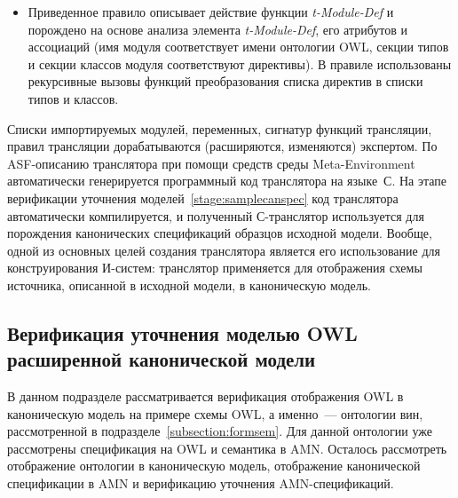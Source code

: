 \begin{multicols}{2}
\begin{itemize}
{\small
\hspace*{-2.82115pt}\tabcolsep=0pt\begin{tabular}{lp{75.9mm}}
&\begin{verbatim}
[Module-Def]
Synthesis-Id := t-Module-Name(OwlID),
Type-Specification* :=
t-Type-Specification-List(Directive*),
Class-Declarator* :=
t-Class-Declarator-List(Directive*)
====>
t-Module-Def(Ontology(OwlID Directive*))
=
{ Synthesis-Id; in: module;
  type: Type-Specification*;
  class_specification:
   Class-Declarator*;
}
\end{verbatim}\\
\end{tabular}
}

\item [\ ] Приведенное правило описывает действие функции {\it t-Module-Def} и
порождено на основе анализа элемента {\it t-Module-Def}, его атрибутов и
ассоциаций (имя модуля соответствует имени онтологии OWL,
секции типов и секции классов модуля соответствуют директивы).
В правиле использованы рекурсивные вызовы функций
преобразования списка директив в списки типов и классов.
\end{itemize}

Списки импортируемых модулей, переменных, сигнатур функций трансляции,
правил трансляции дорабатываются (расширяются, изменяются) экспертом.
%
По ASF-описанию транслятора при помощи средств среды Meta-Environment
автоматически генерируется программный код транслятора на языке~С.
На этапе верификации уточнения моделей~\ref{stage:samplecanspec}
код транслятора автоматически компилируется,
и полученный С-тран\-с\-ля\-тор используется для
по\-рож\-де\-ния канонических спецификаций образцов исходной модели.
Вообще, одной из основных целей создания транслятора является его
использование для конструирования И-сис\-тем:
транслятор применяется для отображения схемы источника,
описанной в исходной модели, в каноническую модель.


\subsection{Верификация уточнения моделью OWL расширенной канонической модели}

В данном подразделе рассматривается верификация отображения OWL
в каноническую модель на примере схемы OWL, а именно~--- онтологии вин,
рассмотренной в подразделе~\ref{subsection:formsem}.
Для данной онтологии уже рассмотрены спецификация на OWL
и семантика в AMN. Осталось рассмотреть отображение онтологии в
каноническую модель, отображение канонической спецификации в AMN
и верификацию уточнения AMN-спецификаций.


\end{multicols}
